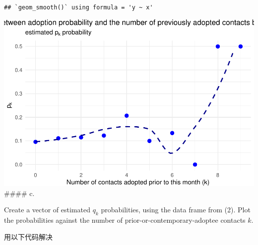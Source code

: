 \documentclass[
]{article}
\begin{document}
\begin{verbatim}
## `geom_smooth()` using formula = 'y ~ x'
\end{verbatim}

\includegraphics{Homework-04_files/figure-latex/unnamed-chunk-3-1.pdf}
\#\#\#\# c.~

Create a vector of estimated \(q_k\) probabilities, using the data frame
from (2). Plot the probabilities against the number of
prior-or-contemporary-adoptee contacts \(k\).

用以下代码解决
\end{document}
